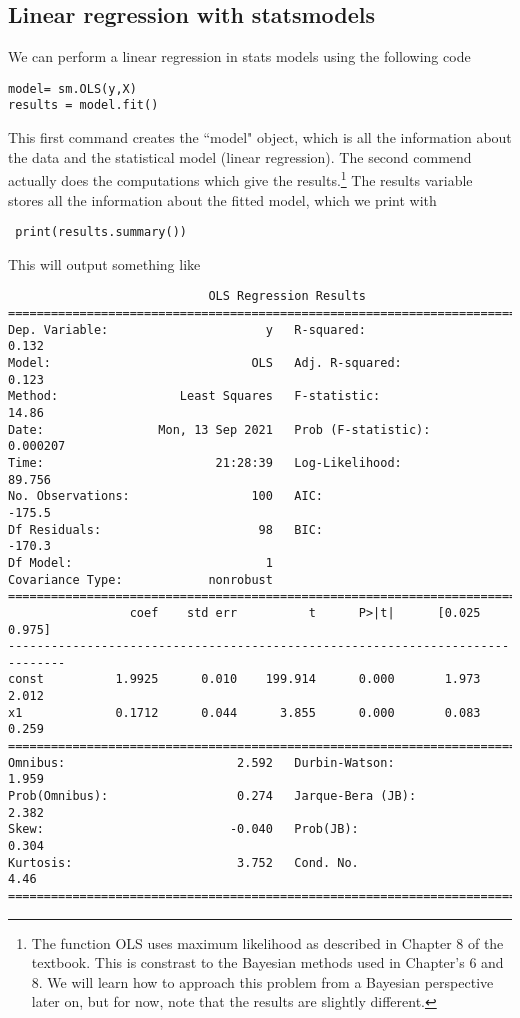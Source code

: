 \subsection{Linear regression with statsmodels}
We can perform a linear regression in stats models using the following code

\begin{Verbatim}
model= sm.OLS(y,X) 
results = model.fit()
\end{Verbatim}
 This first command creates the ``model" object, which is all the information about the data and the statistical model (linear regression). The second commend actually does the computations which give the results.\footnote{The function OLS uses maximum likelihood as described in Chapter 8 of the textbook. This is constrast to the Bayesian methods used in Chapter's 6 and 8. We will learn how to approach this problem from a Bayesian perspective later on, but for now, note that the results are slightly different.}
 The results variable stores all the information about the fitted model, which we print with 
 \begin{Verbatim}
 print(results.summary())
 \end{Verbatim}
 
 This will output something like 
 \begin{Verbatim}
                            OLS Regression Results                            
==============================================================================
Dep. Variable:                      y   R-squared:                       0.132
Model:                            OLS   Adj. R-squared:                  0.123
Method:                 Least Squares   F-statistic:                     14.86
Date:                Mon, 13 Sep 2021   Prob (F-statistic):           0.000207
Time:                        21:28:39   Log-Likelihood:                 89.756
No. Observations:                 100   AIC:                            -175.5
Df Residuals:                      98   BIC:                            -170.3
Df Model:                           1                                         
Covariance Type:            nonrobust                                         
==============================================================================
                 coef    std err          t      P>|t|      [0.025      0.975]
------------------------------------------------------------------------------
const          1.9925      0.010    199.914      0.000       1.973       2.012
x1             0.1712      0.044      3.855      0.000       0.083       0.259
==============================================================================
Omnibus:                        2.592   Durbin-Watson:                   1.959
Prob(Omnibus):                  0.274   Jarque-Bera (JB):                2.382
Skew:                          -0.040   Prob(JB):                        0.304
Kurtosis:                       3.752   Cond. No.                         4.46
==============================================================================
\end{Verbatim}


